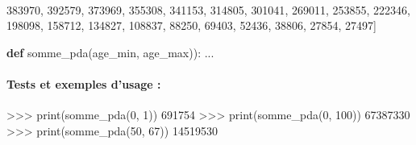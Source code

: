 \documentclass[a4paper,17pt]{extarticle}
\newenvironment{eleve}%
{\begin{activite}\color{noiramu}\\[-0.5cm]}
{\end{activite}}
\newenvironment{Shaded}{}{}
\newcommand{\KeywordTok}[1]{\textcolor[rgb]{0.00,0.44,0.13}{\textbf{{#1}}}}
\newcommand{\DecValTok}[1]{\textcolor[rgb]{0.25,0.63,0.44}{{#1}}}
\newcommand{\NormalTok}[1]{{#1}}
\newcommand{\OperatorTok}[1]{\textcolor[rgb]{0.40,0.40,0.40}{{#1}}}
\newcommand{\BuiltInTok}[1]{{#1}}
\begin{document}
\begin{eleve}
\begin{Shaded}
\begin{Highlighting}[]
       \DecValTok{383970}\NormalTok{, }\DecValTok{392579}\NormalTok{, }\DecValTok{373969}\NormalTok{, }\DecValTok{355308}\NormalTok{, }\DecValTok{341153}\NormalTok{, }\DecValTok{314805}\NormalTok{, }\DecValTok{301041}\NormalTok{, }\DecValTok{269011}\NormalTok{, }\DecValTok{253855}\NormalTok{, }\DecValTok{222346}\NormalTok{, }
       \DecValTok{198098}\NormalTok{, }\DecValTok{158712}\NormalTok{, }\DecValTok{134827}\NormalTok{, }\DecValTok{108837}\NormalTok{, }\DecValTok{88250}\NormalTok{, }\DecValTok{69403}\NormalTok{, }\DecValTok{52436}\NormalTok{, }\DecValTok{38806}\NormalTok{, }\DecValTok{27854}\NormalTok{, }\DecValTok{27497}\NormalTok{]}

\KeywordTok{def}\NormalTok{ somme\_pda(age\_min, age\_max)):}
\NormalTok{    ...}
\end{Highlighting}
\end{Shaded}

\hypertarget{tests-et-exemples-dusage}{%
\paragraph{Tests et exemples d'usage :}\label{tests-et-exemples-dusage}}

\begin{Shaded}
\begin{Highlighting}[]
\OperatorTok{\textgreater{}\textgreater{}\textgreater{}} \BuiltInTok{print}\NormalTok{(somme\_pda(}\DecValTok{0}\NormalTok{, }\DecValTok{1}\NormalTok{))}
\DecValTok{691754}
\OperatorTok{\textgreater{}\textgreater{}\textgreater{}} \BuiltInTok{print}\NormalTok{(somme\_pda(}\DecValTok{0}\NormalTok{, }\DecValTok{100}\NormalTok{))}
\DecValTok{67387330}
\OperatorTok{\textgreater{}\textgreater{}\textgreater{}} \BuiltInTok{print}\NormalTok{(somme\_pda(}\DecValTok{50}\NormalTok{, }\DecValTok{67}\NormalTok{))}
\DecValTok{14519530}
\end{Highlighting}
\end{Shaded}
        
        \end{eleve}
\end{document}
